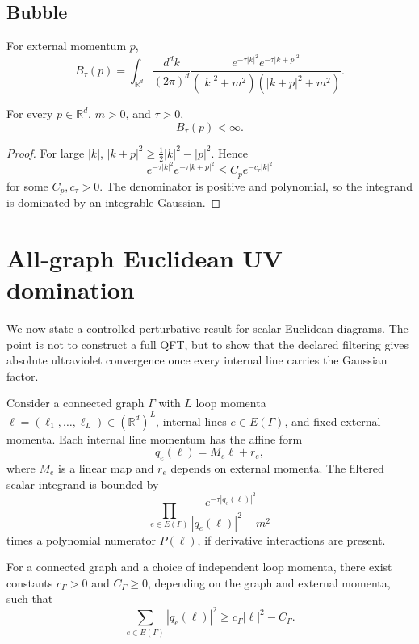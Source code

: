 \documentclass[11pt]{article}
\begin{document}
\subsection{Bubble}

For external momentum \(p\),
\[
        B_\tau(p)
        =
        \int_{\mathbb R^d}
        \frac{d^dk}{(2\pi)^d}
        \frac{e^{-\tau |k|^2}e^{-\tau |k+p|^2}}
        {(|k|^2+m^2)(|k+p|^2+m^2)} .
\]

\begin{proposition}
For every \(p\in\mathbb R^d\), \(m>0\), and \(\tau>0\),
\[
        B_\tau(p)<\infty .
\]
\end{proposition}

\begin{proof}
For large \(|k|\), \(|k+p|^2\ge \frac12|k|^2-|p|^2\). Hence
\[
        e^{-\tau |k|^2}e^{-\tau |k+p|^2}
        \le
        C_p e^{-c_\tau |k|^2}
\]
for some \(C_p,c_\tau>0\). The denominator is positive and polynomial, so the integrand is dominated by an integrable Gaussian.
\end{proof}

\section{All-graph Euclidean UV domination}

We now state a controlled perturbative result for scalar Euclidean diagrams.  The point is not
to construct a full QFT, but to show that the declared filtering gives absolute ultraviolet
convergence once every internal line carries the Gaussian factor.

Consider a connected graph \(\Gamma\) with \(L\) loop momenta \(\ell=(\ell_1,\dots,\ell_L)\in(\mathbb R^d)^L\), internal lines \(e\in E(\Gamma)\), and fixed external momenta. Each internal line momentum has the affine form
\[
        q_e(\ell)=M_e\ell+r_e,
\]
where \(M_e\) is a linear map and \(r_e\) depends on external momenta. The filtered scalar integrand is bounded by
\[
        \prod_{e\in E(\Gamma)}
        \frac{e^{-\tau |q_e(\ell)|^2}}
        {|q_e(\ell)|^2+m^2}
\]
times a polynomial numerator \(P(\ell)\), if derivative interactions are present.

\begin{lemma}
For a connected graph and a choice of independent loop momenta, there exist constants \(c_\Gamma>0\) and \(C_\Gamma\ge0\), depending on the graph and external momenta, such that
\[
        \sum_{e\in E(\Gamma)} |q_e(\ell)|^2
        \ge
        c_\Gamma |\ell|^2-C_\Gamma .
\]
\end{lemma}
\end{document}
